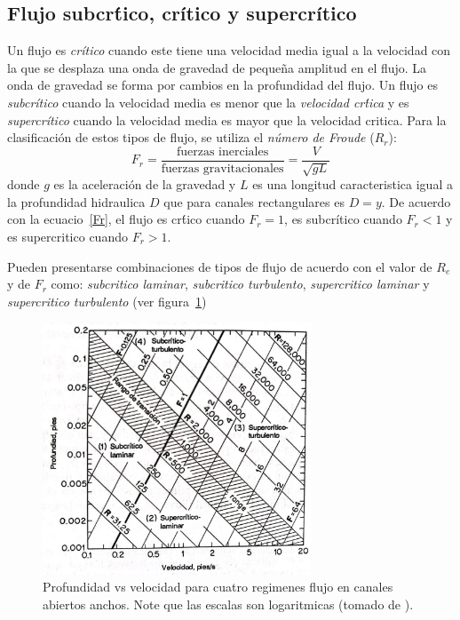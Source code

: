 \documentclass[11pt, oneside]{article}
\begin{document}
\subsection{Flujo subcr\'tico, cr\'itico y supercr\'itico}
Un flujo es \emph{cr\'itico} cuando este tiene una velocidad media igual a la velocidad con la que se desplaza una onda de gravedad de pequeña amplitud en el flujo. La onda de gravedad se forma por cambios en la profundidad del flujo. Un flujo es \emph{subcr\'itico} cuando la velocidad media es menor que la \emph{velocidad cr\'tica} y es \emph{supercr\'itico} cuando la velocidad media es mayor que la velocidad critica. Para la clasificaci\'on de estos tipos de flujo, se utiliza el \emph{n\'umero de Froude} ($R_r$):
\begin{equation}
F_r = \frac{\text{fuerzas inerciales}}{\text{fuerzas gravitacionales}} = \frac{V}{\sqrt{g L}}
\label{Fr}
\end{equation}
donde $g$ es la aceleraci\'on de la gravedad y $L$ es una longitud caracteristica igual a la profundidad hidraulica $D$ que para canales rectangulares es $D=y$. De acuerdo con la ecuacio~\ref{Fr}, el flujo es cr\'tico cuando $F_r = 1$, es subcr\'itico cuando $F_r < 1$ y es supercritico cuando $F_r > 1$.

Pueden presentarse combinaciones de tipos de flujo de acuerdo con el valor de $R_e$ y de $F_r$ como: \emph{subcritico laminar}, \emph{subcritico turbulento}, \emph{supercritico laminar} y \emph{supercritico turbulento} (ver figura~\ref{fig41})

\begin{figure}[h]
\centering
\includegraphics[width=8cm]{fig41.jpeg}
\caption{Profundidad vs velocidad para cuatro regimenes flujo en canales abiertos anchos. Note que las escalas son logaritmicas (tomado de \cite{VChow}).}
\label{fig41}
\end{figure}
\end{document}
